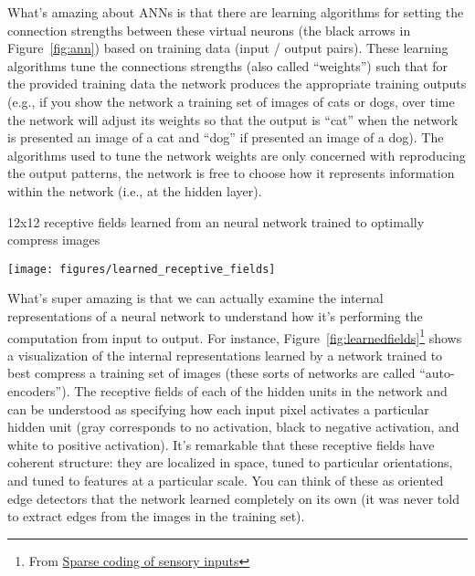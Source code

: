 \documentclass[assignment01_Solutions]{subfiles}
\begin{document}
What's amazing about ANNs is that there are learning algorithms for setting the connection strengths between these virtual neurons (the black arrows in Figure~\ref{fig:ann}) based on training data (input / output pairs).  These learning algorithms tune the connections strengths (also called ``weights'') such that for the provided training data the network produces the appropriate training outputs (e.g., if you show the network a training set of images of cats or dogs, over time the network will adjust its weights so that the output is ``cat'' when the network is presented an image of a cat and ``dog'' if presented an image of a dog).  The algorithms used to tune the network weights are only concerned with reproducing the output patterns, the network is free to choose how it represents information within the network (i.e., at the hidden layer).

\begin{marginfigure}
\caption{12x12 receptive fields learned from an neural network trained to optimally compress images}
\texttt{[image: figures/learned\_receptive\_fields]}
\label{fig:learnedfields}
\end{marginfigure}

What's super amazing is that we can actually examine the internal representations of a neural network to understand how it's performing the computation from input to output. For instance, Figure~\ref{fig:learnedfields}\footnote{From \href{http://www.cnbc.cmu.edu/~tai/nc19journalclubs/Olshausen-Field-CON-2004-1.pdf}{Sparse coding of sensory inputs}} shows a visualization of the internal representations learned by a network trained to best compress a training set of images (these sorts of networks are called ``auto-encoders'').  The receptive fields of each of the hidden units in the network and can be understood as specifying how each input pixel activates a particular hidden unit (gray corresponds to no activation, black to negative activation, and white to positive activation).  It's remarkable that these receptive fields have coherent structure: they are localized in space, tuned to particular orientations, and tuned to features at a particular scale.  You can think of these as oriented edge detectors that the network learned completely on its own (it was never told to extract edges from the images in the training set).
\end{document}
